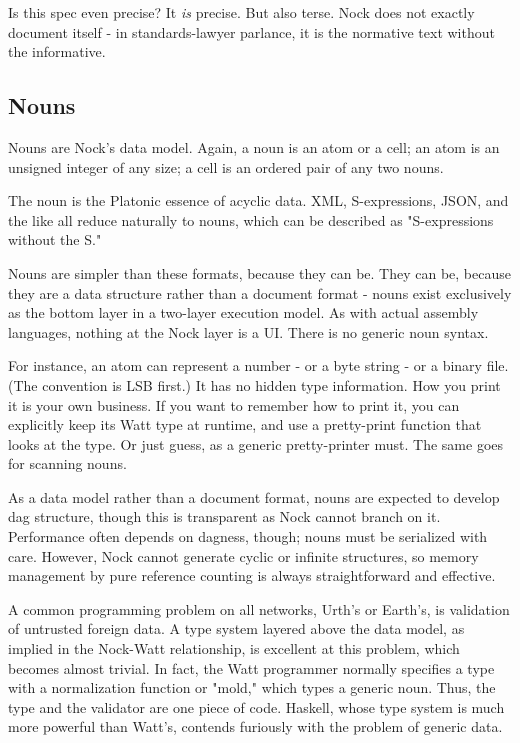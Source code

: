 \documentclass[10pt, nocopyrightspace]{sigplanconf}
\begin{document}
Is this spec even precise?  It \emph{is} precise.  But also terse.  Nock does
not exactly document itself - in standards-lawyer parlance, it is
the normative text without the informative. 

\subsection{Nouns}

Nouns are Nock's data model.  Again, a noun is an atom or a cell;
an atom is an unsigned integer of any size; a cell is an ordered
pair of any two nouns.

The noun is the Platonic essence of acyclic data.  XML,
S-expressions, JSON, and the like all reduce naturally to 
nouns, which can be described as "S-expressions without the S."

Nouns are simpler than these formats, because they can be.  They
can be, because they are a data structure rather than a document
format - nouns exist exclusively as the bottom layer in a
two-layer execution model.  As with actual assembly
languages, nothing at the Nock layer is a UI.  There is no
generic noun syntax.

For instance, an atom can represent a number - or a byte string
- or a binary file. (The convention is LSB first.)  It has no
hidden type information.  How you print it is your own business.
If you want to remember how to print it, you can explicitly keep
its Watt type at runtime, and use a pretty-print function that
looks at the type.  Or just guess, as a generic pretty-printer
must.  The same goes for scanning nouns.

As a data model rather than a document format, nouns are expected
to develop dag structure, though this is transparent as Nock
cannot branch on it.  Performance often depends on dagness,
though; nouns must be serialized with care.  However, Nock cannot
generate cyclic or infinite structures, so memory management by
pure reference counting is always straightforward and effective.

A common programming problem on all networks, Urth's or Earth's,
is validation of untrusted foreign data.  A type system layered
above the data model, as implied in the Nock-Watt relationship,
is excellent at this problem, which becomes almost trivial.  In
fact, the Watt programmer normally specifies a type with a
normalization function or "mold," which types a generic noun.
Thus, the type and the validator are one piece of code.  Haskell,
whose type system is much more powerful than Watt's, contends
furiously with the problem of generic data.
\end{document}
